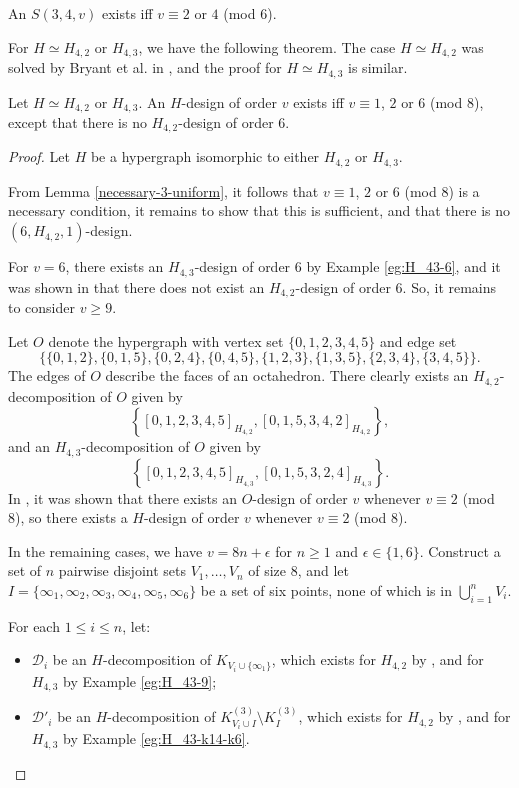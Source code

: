 \begin{theorem} \label{thm:K4^3}
An $S(3, 4, v)$ exists iff $v \equiv 2$ or $4$ (mod $6$).
\end{theorem}


For $H \simeq H_{4,2}$ or $H_{4,3}$, we have the following theorem.
The case $H \simeq H_{4,2}$ was solved by Bryant et al. in \cite{bryant}, and the proof for $H \simeq H_{4,3}$ is similar.

\begin{theorem} \label{thm:H_42,H_43}
Let $H \simeq H_{4,2}$ or $H_{4,3}$.
An $H$-design of order $v$ exists iff $v \equiv 1$, $2$ or $6$ (mod $8$),
  except that there is no $H_{4,2}$-design of order $6$.
\end{theorem}

\begin{proof}
Let $H$ be a hypergraph isomorphic to either $H_{4,2}$ or $H_{4,3}$.

From Lemma \ref{necessary-3-uniform}, it follows that $v \equiv 1$, $2$ or $6$ (mod $8$) is a necessary condition,
   it remains to show that this is sufficient, and that there is no $(6, H_{4,2}, 1)$-design.

For $v = 6$, there exists an $H_{4,3}$-design of order 6 by Example \ref{eg:H_43-6},
  and it was shown in \cite{bryant} that there does not exist an $H_{4,2}$-design of order 6. So, it remains to consider $v \geq 9$.

Let $O$ denote the hypergraph with vertex set $\{0,1,2,3,4,5\}$ and edge set
\[
    \{\{0,1,2\},\{0,1,5\},\{0,2,4\},\{0,4,5\},\{1,2,3\},\{1,3,5\},\{2,3,4\},\{3,4,5\}\}.
\]
The edges of $O$ describe the faces of an octahedron.
There clearly exists an $H_{4,2}$-decomposition of $O$ given by \[ \left\{ [0,1,2,3,4,5]_{H_{4,2}}, [0,1,5,3,4,2]_{H_{4,2}} \right\}, \]
  and an $H_{4,3}$-decomposition of $O$ given by \[ \left\{[0,1,2,3,4,5]_{H_{4,3}}, [0,1,5,3,2,4]_{H_{4,3}} \right\}. \]
In \cite{hanani}, it was shown that there exists an $O$-design of order $v$ whenever $v \equiv 2$ (mod 8),
  so there exists a $H$-design of order $v$ whenever $v \equiv 2$ (mod 8).


In the remaining cases, we have $v = 8n + \epsilon$ for $n \geq 1$ and $\epsilon \in \{1,6\}$.
Construct a set of $n$ pairwise disjoint sets $V_1, \ldots, V_n$ of size 8,
  and let $I = \{\infty_1, \infty_2, \infty_3, \infty_4, \infty_5, \infty_6\}$ be a set of six points, none of which is in $\bigcup_{i=1}^{n} V_i$.

For each $1 \leq i \leq n$, let:
\begin{itemize}
  \item $\mathcal{D}_i$ be an $H$-decomposition of $K_{V_i \cup \{\infty_1\}}$,
  which exists for $H_{4,2}$ by \cite{bryant}, and for $H_{4,3}$ by Example \ref{eg:H_43-9};
  \item $\mathcal{D}'_i$ be an $H$-decomposition of $K_{V_i \cup I}^{(3)} \setminus K_{I}^{(3)}$,
  which exists for $H_{4,2}$ by \cite{bryant}, and for $H_{4,3}$ by Example \ref{eg:H_43-k14-k6}.
\end{itemize}


\end{proof}
